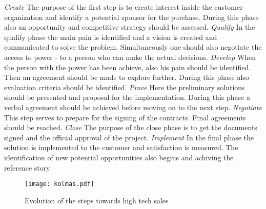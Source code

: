 \documentclass[12pt,a4paper,oneside,pdftex]{report}
\begin{document}
\newline \newline 
\emph{Create}\newline 
The purpose of the first step is to create interest inside the customer organization and identify a potential sponsor for the purchase. During this phase also an opportunity and competitive strategy should be assessed. \citep{Eades}\newline \newline
\emph{Qualify}\newline 
In the qualify phase the main pain is identified and a vision is created and communicated to solve the problem. Simultaneously one should also negotiate the access to power - to a person who can make the actual decisions. 
 \citep{Eades}\newline \newline
\emph{Develop}\newline
When the person with the power has been achieve, also his pain should be identified. Then an agreement should be made to explore further. During this phase also evaluation criteria should be identified. 
\citep{Eades} \newline \newline
\emph{Prove}\newline
Here the preliminary solutions should be presented and proposal for the implementation. During this phase a verbal agreement should be achieved before moving on to the next step.  \citep{Eades}\newline \newline
\emph{Negotiate}\newline
This step serves to prepare for the signing of the contracts. Final agreements should be reached. \citep{Eades}\newline \newline
\emph{Close}\newline
The purpose of the close phase is to get the documents signed and the official approval of the project. \citep{Eades} \newline \newline
\emph{Implement}\newline
In the final phase the solution is implemented to the customer and satisfaction is measured. The identification of new potential opportunities also begins and achiving the reference story \citep{Eades}
\newline


\begin{figure}[ht]
  \begin{center}
    \texttt{[image: kolmas.pdf]}
    \caption{Evolution of the steps towards high tech sales}
    \label{fig:kolmas}
  \end{center}
\end{figure}
\end{document}
